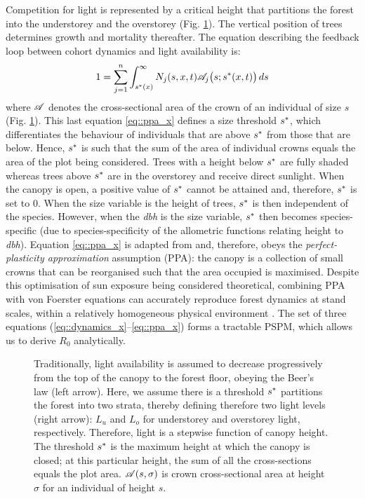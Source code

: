 Competition for light is represented by a critical height that partitions the forest into the understorey and the overstorey (Fig. \ref{fig::ppa}). The vertical position of trees determines growth and mortality thereafter. The equation describing the feedback loop between cohort dynamics and light availability is:
\begin{equation}
	1 = \sum_{j = 1}^{n} \int_{{s}^{*}(x)}^{\infty} N_j(s, x, t) \mathscr{A}_j \big(s; {s}^{*}(x, t)\big) \, ds \label{eq::ppa_x}
\end{equation}
where $ \mathscr{A} $ denotes the cross-sectional area of the crown of an individual of size $ s $ (Fig. \ref{fig::ppa}). This last equation \eqref{eq::ppa_x} defines a size threshold $ {s}^{*} $, which differentiates the behaviour of individuals that are above $ {s}^{*} $ from those that are below. Hence, $ {s}^{*} $ is such that the sum of the area of individual crowns equals the area of the plot being considered. Trees with a height below $ {s}^{*} $ are fully shaded whereas trees above $ {s}^{*} $ are in the overstorey and receive direct sunlight. When the canopy is open, a positive value of $ {s}^{*} $ cannot be attained and, therefore, $ {s}^{*} $ is set to $ 0 $. When the size variable is the height of trees, $ {s}^{*} $ is then independent of the species. However, when the \textit{dbh} is the size variable, $ {s}^{*} $ then becomes species-specific (due to species-specificity of the allometric functions relating height to \textit{dbh}). Equation \eqref{eq::ppa_x} is adapted from \citet{Strigul2008} and, therefore, obeys the \textit{perfect-plasticity approximation} assumption (PPA): the canopy is a collection of small crowns that can be reorganised such that the area occupied is maximised. Despite this optimisation of sun exposure being considered theoretical, combining PPA with von Foerster equations can accurately reproduce forest dynamics at stand scales, within a relatively homogeneous physical environment \citep{Strigul2008, Purves2008}. The set of three equations (\ref{eq::dynamics_x}--\ref{eq::ppa_x}) forms a tractable PSPM, which allows us to derive $ R_0 $ analytically.

\begin{figure}
	\centering
	
	\caption{Traditionally, light availability is assumed to decrease progressively from the top of the canopy to the forest floor, obeying the Beer's law (left arrow). Here, we assume there is a threshold $ {s}^{*} $ partitions the forest into two strata, thereby defining therefore two light levels (right arrow): $ L_u $ and $ L_o $ for understorey and overstorey light, respectively. Therefore, light is a stepwise function of canopy height. The threshold $ {s}^{*} $ is the maximum height at which the canopy is closed; at this particular height, the sum of all the cross-sections equals the plot area. $ \mathscr{A}(s, \sigma) $ is crown cross-sectional area at height $ \sigma $ for an individual of height $ s $. \label{fig::ppa}}
\end{figure}

